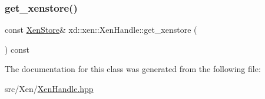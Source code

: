\mbox{\label{classxd_1_1xen_1_1_xen_handle_a97bb8a801b2012d674644724f7d80c7f}} 
\subsubsection{\texorpdfstring{get\+\_\+xenstore()}{get\_xenstore()}}
{\footnotesize\ttfamily const \mbox{\hyperlink{classxd_1_1xen_1_1_xen_store}{Xen\+Store}}\& xd\+::xen\+::\+Xen\+Handle\+::get\+\_\+xenstore (\begin{DoxyParamCaption}{ }\end{DoxyParamCaption}) const\hspace{0.3cm}{\ttfamily [inline]}}



The documentation for this class was generated from the following file\+:\begin{DoxyCompactItemize}
\item 
src/\+Xen/\mbox{\hyperlink{_xen_handle_8hpp}{Xen\+Handle.\+hpp}}\end{DoxyCompactItemize}
